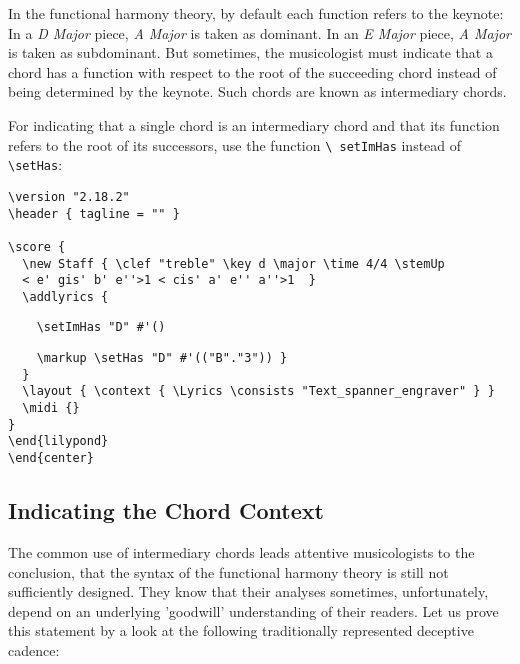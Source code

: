 \documentclass[
  DIV=calc,
  BCOR=5mm,
  12pt,
  headings=small,
  oneside,
  abstract=true,
  toc=bib,
  xcolor=dvipsnames,
  openany,
  ngerman,english]{scrartcl}
\newcommand{\acc}[0]{\textit}
\begin{document}
In the functional harmony theory, by default each function refers to the
keynote: In a \acc{D Major} piece, \acc{A Major} is taken as dominant. In an
\acc{E Major} piece, \acc{A Major} is taken as subdominant. But sometimes, the
musicologist must indicate that a chord has a function with respect to the root
of the succeeding chord instead of being determined by the keynote. Such chords
are known as intermediary chords.

For indicating that a single chord is an intermediary chord and that its function
refers to the root of its successors, use the function \texttt{\textbackslash
setImHas} instead of \texttt{\textbackslash setHas}:

\begin{center}
\end{center}

\begin{scriptsize}
\begin{verbatim}
\version "2.18.2"
\header { tagline = "" }

\score {
  \new Staff { \clef "treble" \key d \major \time 4/4 \stemUp 
  < e' gis' b' e''>1 < cis' a' e'' a''>1  }
  \addlyrics { 
\end{verbatim}
{ \color{red} \verb|    \setImHas "D" #'() | }
\begin{verbatim}  
    \markup \setHas "D" #'(("B"."3")) }  
  }
  \layout { \context { \Lyrics \consists "Text_spanner_engraver" } }
  \midi {}
}
\end{lilypond}
\end{center}
\end{verbatim}
\end{scriptsize} 
 
\subsection{Indicating the Chord Context}

The common use of intermediary chords leads attentive musicologists to the
conclusion, that the syntax of the functional harmony theory is still not
sufficiently designed. They know that their analyses sometimes, unfortunately,
depend on an underlying 'goodwill' understanding of their readers. Let us prove
this statement by a look at the following traditionally represented deceptive
cadence:
\end{document}

